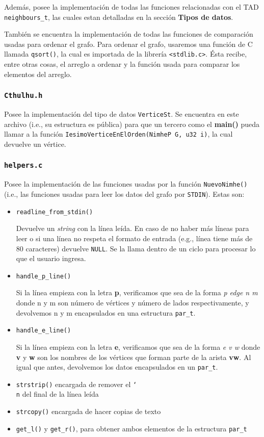\documentclass[11pt]{article}   	%
\begin{document}
Además, posee la implementación de todas las funciones relacionadas
con el TAD \texttt{neighbours\_t}, las cuales estan detalladas en la sección \textbf{Tipos de datos}.

También se encuentra la implementación de todas las funciones de comparación usadas para ordenar el grafo.
Para ordenar el grafo, usaremos una función de C llamada \texttt{qsort()}, la cual es importada de
la librería \texttt{<stdlib.c>}. Ésta recibe, entre otras cosas, el arreglo a ordenar y la función usada
para comparar los elementos del arreglo.

\subsubsection{\texttt{Cthulhu.h}}
Posee la implementación del tipo de datos \texttt{VerticeSt}. Se encuentra en este archivo (i.e., su estructura es pública)
para que un tercero como el \textbf{main()} pueda llamar a la función \texttt{IesimoVerticeEnElOrden(NimheP G, u32 i)}, la cual devuelve un vértice.

\subsubsection{\texttt{helpers.c}}
Posee la implementación de las funciones usadas por la función \texttt{NuevoNimhe()} (i.e., las funciones
usadas para leer los datos del grafo por \texttt{STDIN}). Estas son:
\begin{itemize}
\item \texttt{readline\_from\_stdin()}

Devuelve un \emph{string} con la línea leída. En caso de no haber más líneas para leer o si una línea no
respeta el formato de entrada (e.g., línea tiene más de 80 caracteres)
devuelve \texttt{NULL}. Se la llama dentro de un ciclo para procesar lo que el usuario ingresa.
\item \texttt{handle\_p\_line()}

Si la línea empieza con la letra \textbf{p}, verificamos que sea de la forma \emph{p edge n m} donde n y m
son número de vértices y número de lados respectivamente, y devolvemos n y m encapsulados en una estructura
\texttt{par\_t}.
\item \texttt{handle\_e\_line()}

Si la línea empieza con la letra \textbf{e}, verificamos que sea de la forma \emph{e v w} donde \textbf{v} y \textbf{w} son los
nombres de los vértices que forman parte de la arista \textbf{vw}. Al igual que antes, devolvemos los datos
encapsulados en un \texttt{par\_t}. 
\item \texttt{strstrip()} encargada de remover el \texttt{\char`\\n} del final de la línea leída
\item \texttt{strcopy()} encargada de hacer copias de texto
\item \texttt{get\_l()} y \texttt{get\_r()}, para obtener ambos elementos de la estructura \texttt{par\_t}
\end{itemize}
\end{document}
